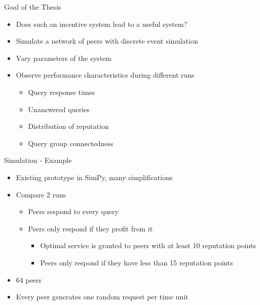\documentclass[presentation,english,usenames,dvipsnames]{beamer}
\begin{document}
\begin{frame}{Goal of the Thesis}
  \begin{itemize}
    \item Does such an incentive system lead to a useful system?
    \item Simulate a network of peers with discrete event simulation
    \item Vary parameters of the system
    \item Observe performance characteristics during different runs
    \begin{itemize}
      \item Query response times
      \item Unanswered queries
      \item Distribution of reputation
      \item Query group connectedness
    \end{itemize}
  \end{itemize}
\end{frame}

\begin{frame}{Simulation - Example}
  \begin{itemize}
    \item Existing prototype in SimPy, many simplifications
    \item Compare 2 runs
    \begin{itemize}
      \item Peers respond to every query
      \item Peers only respond if they profit from it
      \begin{itemize}
        \item Optimal service is granted to peers with at least 10 reputation
              points
        \item Peers only respond if they have less than 15 reputation points
      \end{itemize}
    \end{itemize}
    \item 64 peers
    \item Every peer generates one random request per time unit
  \end{itemize}
\end{frame}
\end{document}
